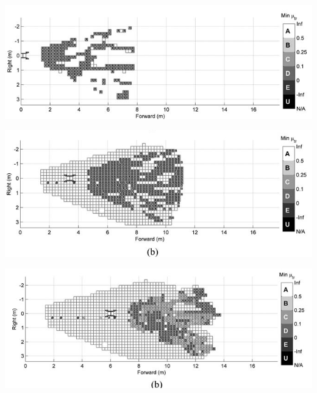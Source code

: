     \begin{frame}[c]
        \begin{center}
            \includegraphics[width=\textwidth]{./media/resultat1.jpg}
        \end{center}        
    \end{frame}
    
    \begin{frame}[c]
        \begin{center}
            \includegraphics[width=\textwidth]{./media/resultat2.jpg}
        \end{center}        
    \end{frame}
    
    \begin{frame}[c]
        \begin{center}
            \includegraphics[width=\textwidth]{./media/resultat3.jpg}
        \end{center}        
    \end{frame}    
    
